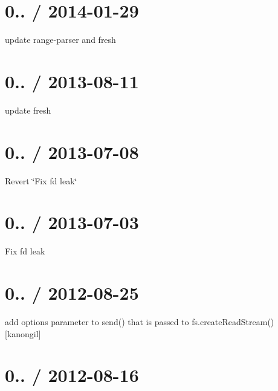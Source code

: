 \section*{0.. / 2014-\/01-\/29 }


\begin{DoxyItemize}
\item update range-\/parser and fresh
\end{DoxyItemize}

\section*{0.. / 2013-\/08-\/11 }


\begin{DoxyItemize}
\item update fresh
\end{DoxyItemize}

\section*{0.. / 2013-\/07-\/08 }


\begin{DoxyItemize}
\item Revert \char`\"{}\+Fix fd leak\char`\"{}
\end{DoxyItemize}

\section*{0.. / 2013-\/07-\/03 }


\begin{DoxyItemize}
\item Fix fd leak
\end{DoxyItemize}

\section*{0.. / 2012-\/08-\/25 }


\begin{DoxyItemize}
\item add options parameter to send() that is passed to fs.\+create\+Read\+Stream() \mbox{[}kanongil\mbox{]}
\end{DoxyItemize}

\section*{0.. / 2012-\/08-\/16 }


